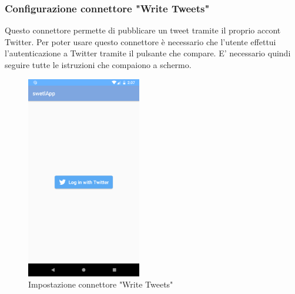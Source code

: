 \subsubsection{Configurazione connettore "Write Tweets"}
Questo connettore permette di pubblicare un tweet tramite il proprio accont Twitter. Per poter usare questo connettore è necessario che l'utente effettui l'autenticazione a Twitter tramite il pulsante che compare.
E' necessario quindi seguire tutte le istruzioni che compaiono a schermo.
\begin{figure}[H]
	\centering
	\includegraphics[width=5cm]{../includes/pics/conf_twitter_write.png}
	\caption{\label{fig:conf_twitter_write}Impostazione connettore "Write Tweets"}
\end{figure}


